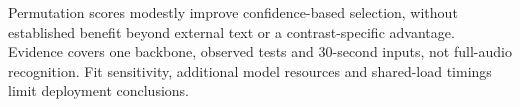Permutation scores modestly improve confidence-based selection, without established benefit beyond external text or a contrast-specific advantage. Evidence covers one backbone, observed tests and 30-second inputs, not full-audio recognition. Fit sensitivity, additional model resources and shared-load timings limit deployment conclusions.
